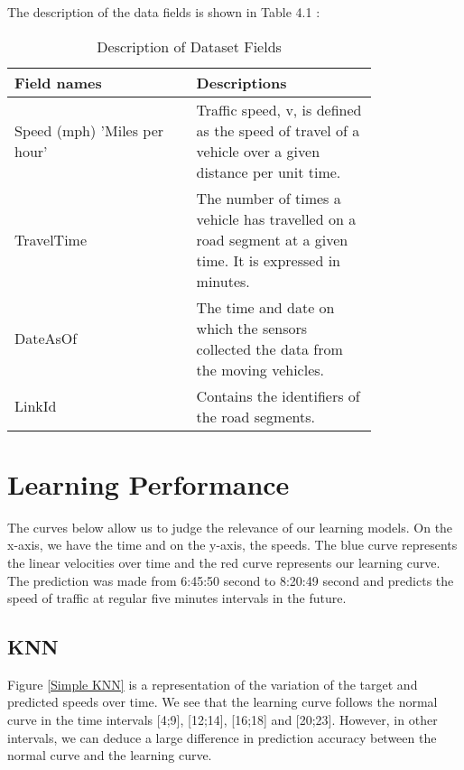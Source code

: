 The description of the data fields is shown in Table 4.1 : \\


\begin{table}[!hbt]
	 \caption{Description of Dataset Fields}
	\centering
     \begin{tabular}{|>{\centering}p{0.4\linewidth}|>{\centering\arraybackslash}p{0.4\linewidth}|}
     	\hline  
     	\textbf{Field names }
     	&    \textbf{Descriptions}\\  
     	\hline
     	Speed (mph) 'Miles per hour' &  Traffic speed, v, is defined as the speed of travel of a vehicle over a given distance per unit time.\\   
     	\hline
     	TravelTime & 
     	The number of times a vehicle has travelled on a road segment at a given time. It is expressed in minutes.\\       
     	\hline 
     	DateAsOf & The time and date on which the sensors collected the data from the moving vehicles.\\        
     	\hline
     	LinkId & Contains the identifiers of the road segments.\\
     	\hline
     \end{tabular}
\end{table}

\section{Learning Performance}
The curves below allow us to judge the relevance of our learning models. On the x-axis, we have the time and on the y-axis, the speeds. The blue curve represents the linear velocities over time and the red curve represents our learning curve. The prediction was made from 6:45:50 second to 8:20:49 second and predicts the speed of traffic at regular five minutes intervals in the future. 

\subsection{KNN}

Figure \ref{Simple KNN} is a representation of the variation of the target and predicted speeds over time. We see that the learning curve follows the normal curve in the time intervals [4;9], [12;14], [16;18] and [20;23]. However, in other intervals, we can deduce a large difference in prediction accuracy between the normal curve and the learning curve.
\pagebreak

